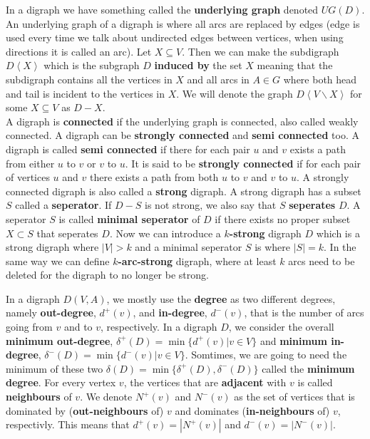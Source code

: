 In a digraph we have something called the \textbf{underlying graph} denoted $UG(D)$. 
An underlying graph of a digraph is where all arcs are replaced by edges (edge is used every time we talk about undirected edges between vertices, when using directions it is called an arc).
Let $X \subseteq V$. 
Then we can make the subdigraph $D\left< X\right>$ which is the subgraph $D$ \textbf{induced by} the set $X$ meaning that the subdigraph contains all the vertices in $X$ and all arcs in $A\in G$ where both head and tail is incident to the vertices in $X$. 
We will denote the graph $D\left< V\backslash X\right>$ for some $X\subseteq V$ as $D-X$.\\
A digraph is \textbf{connected} if the underlying graph is connected, also called weakly connected. 
A digraph can be \textbf{strongly connected} and \textbf{semi connected} too.
A digraph is called \textbf{semi connected} if there for each pair $u$ and $v$ exists a path from either $u$ to $v$ or $v$ to $u$.  
It is said to be \textbf{strongly connected} if for each pair of vertices $u$ and $v$ there exists a path from both $u$ to $v$ and $v$ to $u$. 
A strongly connected digraph is also called a \textbf{strong} digraph. 
A strong digraph has a subset $S$ called a \textbf{seperator}. 
If $D-S$ is not strong, we also say that $S$ \textbf{seperates} $D$. 
A seperator $S$ is called \textbf{minimal seperator} of $D$ if there exists no proper subset $X\subset S$ that seperates $D$.
Now we can introduce a \textbf{$k$-strong} digraph $D$ which is a strong digraph where $|V|> k$ and a minimal seperator $S$ is  where $|S|= k$.
In the same way we can define \textbf{$k$-arc-strong} digraph, where at least $k$ arcs need to be deleted for the digraph to no longer be strong. 

In a digraph $D(V,A)$, we mostly use the \textbf{degree} as two different degrees, namely \textbf{out-degree}, $d^+(v)$, and \textbf{in-degree}, $d^-(v)$, that is the number of arcs going from $v$ and to $v$, respectively. 
In a digraph $D$, we consider the overall \textbf{minimum out-degree}, $\delta ^+(D)=\min\lbrace d^+(v)|v\in V\rbrace$ and \textbf{minimum in-degree}, $\delta ^-(D)=\min\lbrace d^-(v)|v\in V\rbrace$.
Somtimes, we are going to need the minimum of these two $\delta(D)=\min \lbrace\delta ^+(D),\delta ^-(D) \rbrace$ called the \textbf{minimum degree}.
For every vertex $v$, the vertices that are \textbf{adjacent} with $v$ is called \textbf{neighbours} of $v$.
We denote $N^+(v)$ and $N^-(v)$ as the set of vertices that is dominated by (\textbf{out-neighbours} of) $v$ and dominates (\textbf{in-neighbours} of) $v$, respectivly. 
This means that $d^+(v)=|N^+(v)|$ and $d^-(v)=|N^-(v)|$.\\


